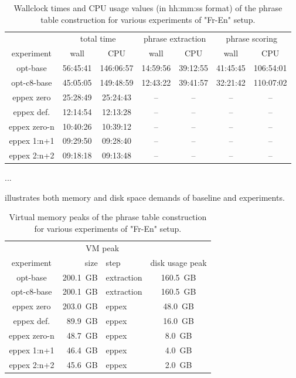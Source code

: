 \begin{table}[ht]
\centering
\begin{tabular}{ | c | c c | c c | c c | }
\hline
 & \multicolumn{2}{|c|}{total time} & \multicolumn{2}{|c|}{phrase extraction} & \multicolumn{2}{|c|}{phrase scoring} \\
experiment & wall & CPU & wall & CPU & wall & CPU \\
\hline
\hline
opt-base      & 56:45:41 & 146:06:57 & 14:59:56 & 39:12:55 & 41:45:45 & 106:54:01 \\
opt-c8-base   & 45:05:05 & 149:48:59 & 12:43:22 & 39:41:57 & 32:21:42 & 110:07:02 \\
eppex zero    & 25:28:49 &  25:24:43 &       -- &       -- &       -- &        -- \\
\hline
eppex def.    & 12:14:54 &  12:13:28 &       -- &       -- &       -- &        -- \\
eppex zero-n  & 10:40:26 &  10:39:12 &       -- &       -- &       -- &        -- \\
eppex 1:n+1   & 09:29:50 &  09:28:40 &       -- &       -- &       -- &        -- \\
eppex 2:n+2   & 09:18:18 &  09:13:48 &       -- &       -- &       -- &        -- \\
\hline
\end{tabular}
\caption{\label{fr-en-time-benchmarks}
Wallclock times and CPU usage values (in hh:mm:ss format) of the phrase table
construction for various experiments of "Fr-En" setup.}
\end{table}

...

 illustrates both memory and disk space demands of baseline
and \eppex{} experiments.

\begin{table}[ht]
\centering
\begin{tabular}{ | c | r l | c | }
\hline
 & \multicolumn{2}{|c|}{VM peak} & \\
experiment & size & step & disk usage peak \\
\hline
\hline
opt-base       & 200.1~GB & extraction & 160.5~GB \\
opt-c8-base    & 200.1~GB & extraction & 160.5~GB \\
eppex zero     & 203.0~GB &      eppex &  48.0~GB \\
\hline
eppex def.     &  89.9~GB &      eppex &  16.0~GB \\
eppex zero-n   &  48.7~GB &      eppex &   8.0~GB \\
eppex 1:n+1    &  46.4~GB &      eppex &   4.0~GB \\
eppex 2:n+2    &  45.6~GB &      eppex &   2.0~GB \\
\hline
\end{tabular}
\caption{\label{fr-en-vm-and-disk-usage-peaks}
Virtual memory peaks of the phrase table construction for various experiments of "Fr-En" setup.}
\end{table}

